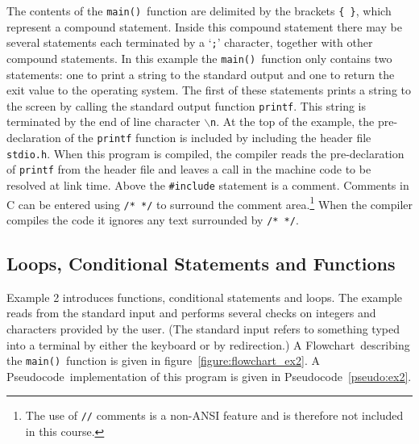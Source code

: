 \documentclass[11pt]{scrartcl}
\def\main{\texttt{main()}}
\def\psc{Pseudocode}
\def\flo{Flowchart}
\begin{document}
The contents of the \main\ function are delimited by the brackets
\texttt{\{ \}}, which represent a compound statement.  Inside this
compound statement there may be several statements each terminated by a
`\texttt{;}' character, together with other compound statements.  In this example the \main\ function only contains two statements: one to print a string to the standard output and one to return the exit value to the operating system.  The first of these statements prints a string to the screen by calling the standard output function \texttt{printf}.  This string is terminated by the end of line character \texttt{$\backslash$n}.  At the top of the example, the pre-declaration of the \texttt{printf} function is included by including the header file \texttt{stdio.h}.  When this program is compiled, the compiler reads the pre-declaration of \texttt{printf}
from the header file and leaves a call in the machine code to be
resolved at link time.  Above the \texttt{\#include} statement is a
comment.  Comments in C can be entered using
\texttt{/* */} to surround the comment area.\footnote{The use of
\texttt{//} comments is a non-ANSI feature and is therefore not
included in this course.}  When the compiler compiles the code it
ignores any text surrounded by \texttt{/* */}.

\clearpage
\newpage

\subsection{Loops, Conditional Statements and Functions}
Example 2 introduces functions, conditional statements and loops.
The example reads from the standard input and performs several
checks on integers and characters provided by the user.  (The standard
input refers to something typed into a terminal by either the keyboard
or by redirection.)  A \flo\ describing the \main\ function is
given in figure~\ref{figure:flowchart_ex2}.  A \psc\
implementation of this program is given in \psc~\ref{pseudo:ex2}.
\end{document}
